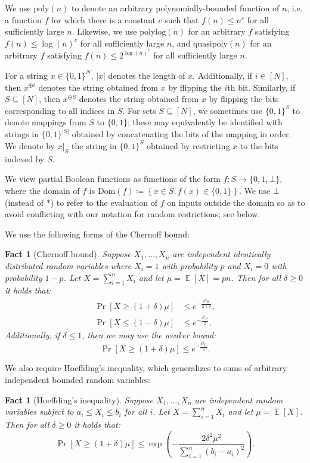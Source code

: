 \documentclass[11pt]{article}%
\newtheorem{fact}[theorem]{Fact}
\newcommand{\E}{\mathop{\mathbb{E}}}
\newcommand{\poly}{\mathrm{poly}}
\newcommand{\polylog}{\mathrm{polylog}}
\newcommand{\quasipoly}{\mathrm{quasipoly}}
\newcommand{\Dom}{\mathrm{Dom}}
\begin{document}
We use $\poly(n)$ to denote an arbitrary polynomially-bounded function of $n$, i.e. a function $f$ for which there is a constant $c$ such that $f(n) \le n^c$ for all sufficiently large $n$. Likewise, we use $\polylog(n)$ for an arbitrary $f$ satisfying $f(n) \le \log(n)^c$ for all sufficiently large $n$, and $\quasipoly(n)$ for an arbitrary $f$ satisfying $f(n) \le 2^{\log(n)^c}$ for all sufficiently large $n$.

For a string $x \in \{0,1\}^N$, $|x|$ denotes the length of $x$. Additionally, if $i \in [N]$, then $x^{\oplus i}$ denotes the string obtained from $x$ by flipping the $i$th bit. Similarly, if $S \subseteq [N]$, then $x^{\oplus S}$ denotes the string obtained from $x$ by flipping the bits corresponding to all indices in $S$. For sets $S \subseteq [N]$, we sometimes use $\{0,1\}^S$ to denote mappings from $S$ to $\{0,1\}$; these may equivalently be identified with strings in $\{0,1\}^{|S|}$ obtained by concatenating the bits of the mapping in order. We denote by $x|_S$ the string in $\{0,1\}^S$ obtained by restricting $x$ to the bits indexed by $S$.

We view partial Boolean functions as functions of the form $f: S \to \{0,1,\bot\}$, where the domain of $f$ is $\Dom(f) \coloneqq \left\{ x \in S : f(x) \in \{0,1\} \right\}$. We use $\bot$ (instead of $*$) to refer to the evaluation of $f$ on inputs outside the domain so as to avoid conflicting with our notation for random restrictions; see  below.

We use the following forms of the Chernoff bound:

\begin{fact}[Chernoff bound]
\label{fact:chernoff}
Suppose $X_1,\ldots,X_n$ are independent identically distributed random variables where $X_i = 1$ with probability $p$ and $X_i = 0$ with probability $1-p$. Let $X = \sum_{i=1}^n X_i$ and let $\mu = \E[X] = pn$. Then for all $\delta \ge 0$ it holds that:
\begin{align*}
\Pr\left[X \ge (1 + \delta)\mu\right] &\le e^{-\frac{\delta^2\mu}{2+\delta}},\\
\Pr\left[X \le (1 - \delta)\mu\right] &\le e^{-\frac{\delta^2\mu}{2}},
\end{align*}
Additionally, if $\delta \le 1$, then we may use the weaker bound:
\[
\Pr\left[X \ge (1 + \delta)\mu\right] \le e^{-\frac{\delta^2\mu}{3}}.
\]
\end{fact}

We also require Hoeffding's inequality, which generalizes  to sums of arbitrary independent bounded random variables:
\begin{fact}[Hoeffding's inequality]
\label{fact:hoeffding}
Suppose $X_1,\ldots,X_n$ are independent random variables subject to $a_i \le X_i \le b_i$ for all $i$. Let $X = \sum_{i=1}^n X_i$ and let $\mu = \E[X]$. Then for all $\delta \ge 0$ it holds that:
\[
\Pr\left[X \ge (1 + \delta)\mu\right] \le \exp\left(-\frac{2\delta^2\mu^2}{ \sum_{i=1}^n (b_i - a_i)^2}\right).
\]

\end{fact}
\end{document}
